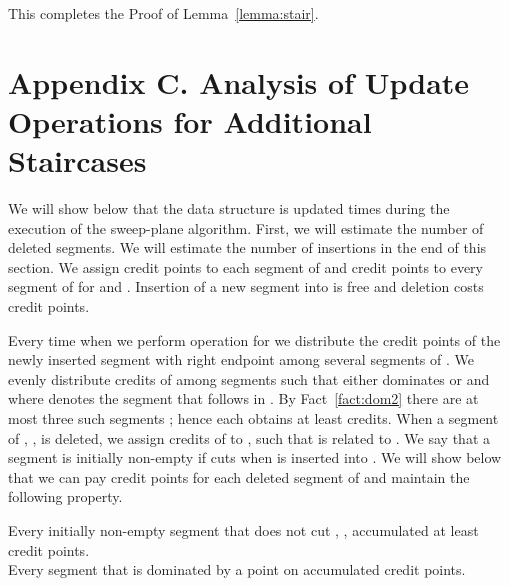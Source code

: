 \documentclass[10pt]{llncs}
\begin{document}
This completes the Proof  of Lemma~\ref{lemma:stair}.


\section*{Appendix C. Analysis of Update Operations for Additional Staircases}
\label{sec:analys}
We will show below  that the data structure  is updated  
times during the execution of the sweep-plane algorithm.
First, we will estimate the number of deleted segments.
We will estimate the number of insertions in the end of this section.
We assign  credit points to each segment of  and 
 credit points to every segment of  for
 and .
Insertion of a new segment into  is free and deletion 
costs  credit points. 

Every time when we perform operation  for 
 we distribute the credit points of 
the newly inserted segment  with right endpoint  among several segments
of . We evenly distribute credits of  among segments 
 such that either  dominates  or  
and  where  denotes the segment 
that follows  in . By Fact~\ref{fact:dom2} there are at most 
three such segments ; hence each  obtains at least  credits. 
When a segment  of , , is deleted, 
we assign credits of  to , such that  is related 
to . 
We say that a segment  is initially non-empty if  cuts 
 when  is inserted into . We will 
show below that we can pay  credit points for each deleted segment 
of  and maintain the following property.
\begin{property}\label{prop:cred}
Every initially non-empty segment  
that does not cut , , 
accumulated at least  credit points.\\ 
Every segment  that is dominated by a point on  
accumulated  credit points.
\end{property}
\end{document}
